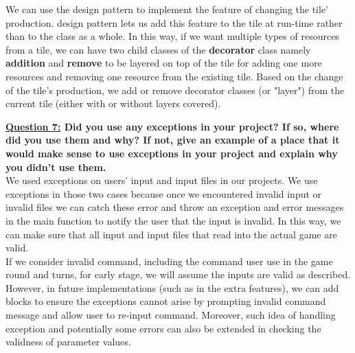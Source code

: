 \documentclass[10pt]{article}
\begin{document}
We can use the \Decorator design pattern to implement the feature of changing the tile' production. \Decorator design pattern lets us add this feature to the tile at run-time rather than to the class as a whole. In this way, if we want multiple types of resources from a tile, we can have two child classes of the \textbf{decorator} class namely \textbf{addition} and \textbf{remove} to be layered on top of the tile for adding one more resources and removing one resource from the existing tile. Based on the change of the tile's production, we add or remove decorator classes (or "layer") from the current tile (either with or without layers covered).

\textbf{\underline{Question 7:} Did you use any exceptions in your project? If so, where did you use them and why? If not, give an example of a place
that it would make sense to use exceptions in your project and explain why you didn’t use them.}\\

We used exceptions on users' input and input files in our projects. We use exceptions in those two cases because once we encountered invalid input or invalid files we can catch these error and throw an exception and error messages in the main function to notify the user that the input is invalid. In this way, we can make sure that all input and input files that read into the actual game are valid.\\

If we consider invalid command, including the command user use in the game round and turns, for early stage, we will assume the inputs are valid as described. However, in future implementations (such as in the extra features), we can add blocks to ensure the exceptions cannot arise by prompting invalid command message and allow user to re-input command. Moreover, such idea of handling exception and potentially some errors can also be extended in checking the validness of parameter values.

 
\end{document}

